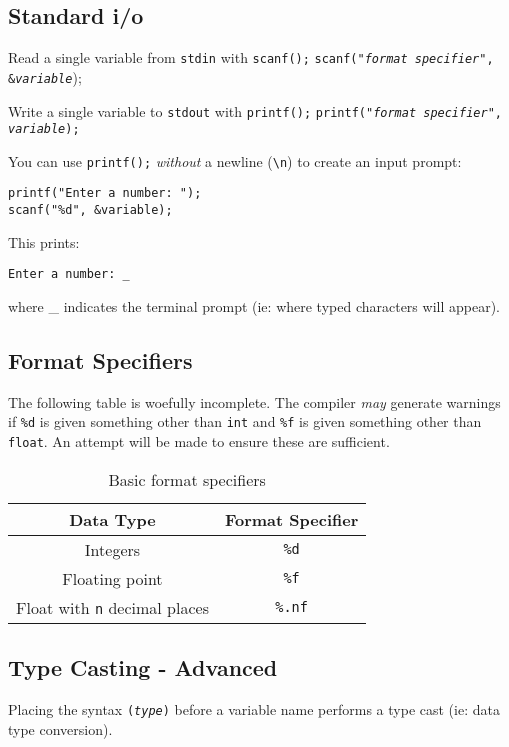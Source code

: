 \documentclass{lab}
\begin{document}
\begin{multicols}{2}
\subsection{Standard i/o}

Read a single variable from \texttt{stdin} with \texttt{scanf();}
\texttt{scanf("\textit{format specifier}", \&\textit{variable}});

Write a single variable to \texttt{stdout} with \texttt{printf();}
\texttt{printf("\textit{format specifier}", \textit{variable});}

You can use \texttt{printf();} \textit{without} a newline (\texttt{\textbackslash n}) to create an input prompt:

\begin{lstlisting}[style=CStyle]
printf("Enter a number: ");
scanf("%d", &variable);
\end{lstlisting}

This prints:

\texttt{Enter a number: \_}

where \_ indicates the terminal prompt (ie: where typed characters will appear).

\subsection{Format Specifiers}
The following table is woefully incomplete. The compiler \textit{may} generate warnings if \texttt{\%d} is given something other than \texttt{int} and \texttt{\%f} is given something other than \texttt{float}. An attempt will be made to ensure these are sufficient.
\begin{table}[H]
\centering
\begin{tabular}{|c|c|}
\hline
Data Type & Format Specifier \\
\hline
Integers & \texttt{\%d} \\
Floating point & \texttt{\%f} \\
Float with \texttt{n} decimal places & \texttt{\%.nf} \\
\hline
\end{tabular}
\caption{Basic format specifiers}
\end{table}

\subsection{Type Casting - Advanced}
Placing the syntax \texttt{(\textit{type})} before a variable name performs a type cast (ie: data type conversion).


\end{multicols}
\end{document}
